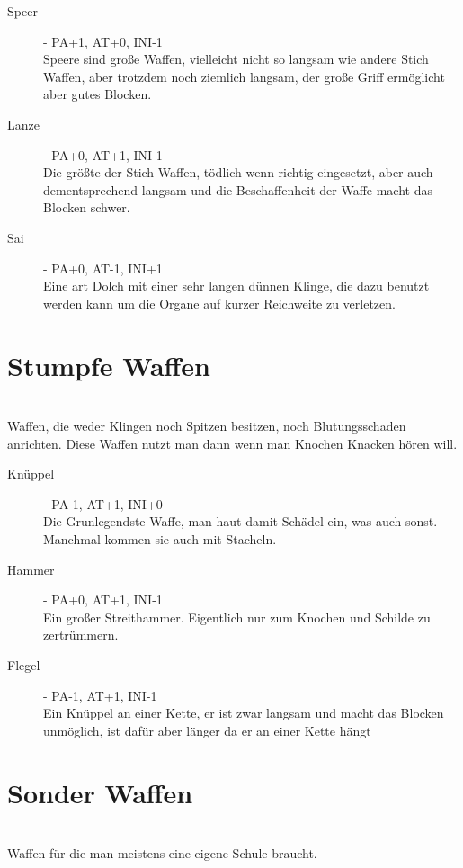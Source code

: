 \documentclass[a4paper,12pt,oneside]{book}
\begin{document}
\begin{description}
\item[Speer] - PA+1, AT+0, INI-1
\\Speere sind große Waffen, vielleicht nicht so langsam wie andere Stich Waffen, aber trotzdem noch ziemlich langsam, der große Griff ermöglicht aber gutes Blocken.
\item[Lanze] - PA+0, AT+1, INI-1
\\Die größte der Stich Waffen, tödlich wenn richtig eingesetzt, aber auch dementsprechend langsam und die Beschaffenheit der Waffe macht das Blocken schwer.
\item[Sai] - PA+0, AT-1, INI+1
\\Eine art Dolch mit einer sehr langen dünnen Klinge, die dazu benutzt werden kann um die Organe auf kurzer Reichweite zu verletzen.
\end{description}

\section{Stumpfe Waffen}
\\ Waffen, die weder Klingen noch Spitzen besitzen, noch Blutungsschaden anrichten. Diese Waffen nutzt man dann wenn man Knochen Knacken hören will. 

\begin{description}
\item[Knüppel] - PA-1, AT+1, INI+0
\\Die Grunlegendste Waffe, man haut damit Schädel ein, was auch sonst. Manchmal kommen sie auch mit Stacheln.
\item[Hammer] - PA+0, AT+1, INI-1
\\Ein großer Streithammer. Eigentlich nur zum Knochen und Schilde zu zertrümmern.
\item[Flegel] - PA-1, AT+1, INI-1
\\Ein Knüppel an einer Kette, er ist zwar langsam und macht das Blocken unmöglich, ist dafür aber länger da er an einer Kette hängt
\end{description}

\section{Sonder Waffen}
\\Waffen für die man meistens eine eigene Schule braucht.
\end{document}
